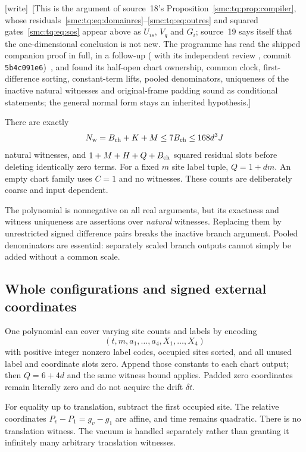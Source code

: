 \documentclass[11pt,letterpaper]{article}
\numberwithin{equation}{section}
\theoremstyle{definition}
\theoremstyle{remark}
\newcommand{\wtag}{\textup{[write]}}
\begin{document}
\wtag\ [This is the argument of source~18's Proposition~\ref{smc:tq:prop:compiler}, whose residuals~\eqref{smc:tq:eq:domainres}--\eqref{smc:tq:eq:outres} and squared gates~\eqref{smc:tq:eq:sos} appear above as $U_{is}$, $V_q$ and $G_i$; source~19 says itself that the one-dimensional conclusion is not new. The programme has read the shipped companion proof  in full, in a follow-up ( with its independent review , commit \texttt{5b4c091e6})~\cite{reviewfixture}, and found its half-open chart ownership, common clock, first-difference sorting, constant-term lifts, pooled denominators, uniqueness of the inactive natural witnesses and original-frame padding sound as conditional statements; the general normal form stays an inherited hypothesis.]

There are exactly
\begin{equation}\label{smc:zd:eq:witnesscount}
 N_{\rm w}=B_{\rm ch}+K+M\le7B_{\rm ch}\le168d^3J
\end{equation}
natural witnesses, and $1+M+H+Q+B_{\rm ch}$ squared residual slots before deleting identically zero terms. For a fixed $m$ site label tuple, $Q=1+dm$. An empty chart family uses $C=1$ and no witnesses. These counts are deliberately coarse and input dependent.

The polynomial is nonnegative on all real arguments, but its exactness and witness uniqueness are assertions over \emph{natural} witnesses. Replacing them by unrestricted signed difference pairs breaks the inactive branch argument. Pooled denominators are essential: separately scaled branch outputs cannot simply be added without a common scale.

\subsection{Whole configurations and signed external coordinates}
One polynomial can cover varying site counts and labels by encoding
\[
 (t,m,a_1,\ldots,a_4,X_1,\ldots,X_4)
\]
with positive integer nonzero label codes, occupied sites sorted, and all unused label and coordinate slots zero. Append those constants to each chart output; then $Q=6+4d$ and the same witness bound applies. Padded zero coordinates remain literally zero and do not acquire the drift $\delta t$.

For equality up to translation, subtract the first occupied site. The relative coordinates $P_v-P_1=g_v-g_1$ are affine, and time remains quadratic. There is no translation witness. The vacuum is handled separately rather than granting it infinitely many arbitrary translation witnesses.
\end{document}
